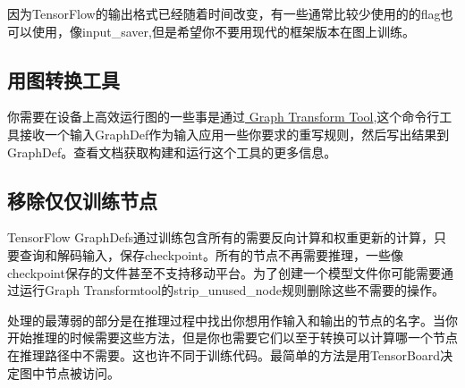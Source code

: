 因为TensorFlow的输出格式已经随着时间改变，有一些通常比较少使用的的flag也可以使用，像input\_saver,但是希望你不要用现代的框架版本在图上训练。
\subsection{用图转换工具}
你需要在设备上高效运行图的一些事是通过\href{https://www.github.com/tensorflow/tensorflow/blob/r1.4/tensorflow/tools/graph_transforms/README.md}{ Graph Transform Tool},这个命令行工具接收一个输入GraphDef作为输入应用一些你要求的重写规则，然后写出结果到GraphDef。查看文档获取构建和运行这个工具的更多信息。
\subsection{移除仅仅训练节点}
TensorFlow GraphDefs通过训练包含所有的需要反向计算和权重更新的计算，只要查询和解码输入，保存checkpoint。所有的节点不再需要推理，一些像checkpoint保存的文件甚至不支持移动平台。为了创建一个模型文件你可能需要通过运行Graph Transformtool的strip\_unused\_node规则删除这些不需要的操作。

处理的最薄弱的部分是在推理过程中找出你想用作输入和输出的节点的名字。当你开始推理的时候需要这些方法，但是你也需要它们以至于转换可以计算哪一个节点在推理路径中不需要。这也许不同于训练代码。最简单的方法是用TensorBoard决定图中节点被访问。

